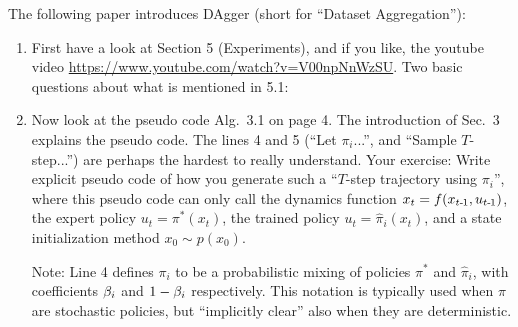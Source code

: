 

\renewcommand{\course}{Robot Learning}
\renewcommand{\coursepicture}{roblearn.png}
\renewcommand{\coursedate}{Summer 2024}
\renewcommand{\exnum}{Weekly Exercise 3}

\renewcommand{\teacher}{Marc Toussaint \& Wolfgang H{\"o}nig}
\renewcommand{\addressTUB}{
  Learning~\&~Intelligent~Systems Lab, Intelligent Multi-Robot Coordination Lab, TU~Berlin\\\small
  Marchstr. 23, 10587 Berlin, Germany
}

\exercises




\exercisestitle



The following paper introduces DAgger (short for ``Dataset Aggregation''):


\begin{enumerate}
\item First have a look at Section 5 (Experiments), and if you like, the youtube video {\urlfont\url{https://www.youtube.com/watch?v=V00npNnWzSU}}. Two basic questions about what is mentioned in 5.1:


\item Now look at the pseudo code Alg.~3.1 on page 4. The introduction of Sec.~3 explains the pseudo code. The lines 4 and 5 (``Let $\pi_i$...'', and ``Sample $T$-step...'') are perhaps the hardest to really understand. Your exercise: Write explicit pseudo code of how you generate such a ``$T$-step trajectory using $\pi_i$'', where this pseudo code can only call the dynamics function $x_t = f(x_{t{{\hspace*{-.0pt}\text{\rm -}\hspace*{-.5pt}}1}},u_{t{{\hspace*{-.0pt}\text{\rm -}\hspace*{-.5pt}}1}})$, the expert policy $u_t = \pi^*(x_t)$, the trained policy $u_t = \hat \pi_i(x_t)$, and a state initialization method $x_0\sim p(x_0)$.

Note: Line 4 defines $\pi_i$ to be a probabilistic mixing of policies
$\pi^*$ and $\hat\pi_i$, with coefficients $\beta_i$ and $1-\beta_i$
respectively. This notation is typically used when $\pi$ are
stochastic policies, but ``implicitly clear'' also when they are
deterministic.


\end{enumerate}

